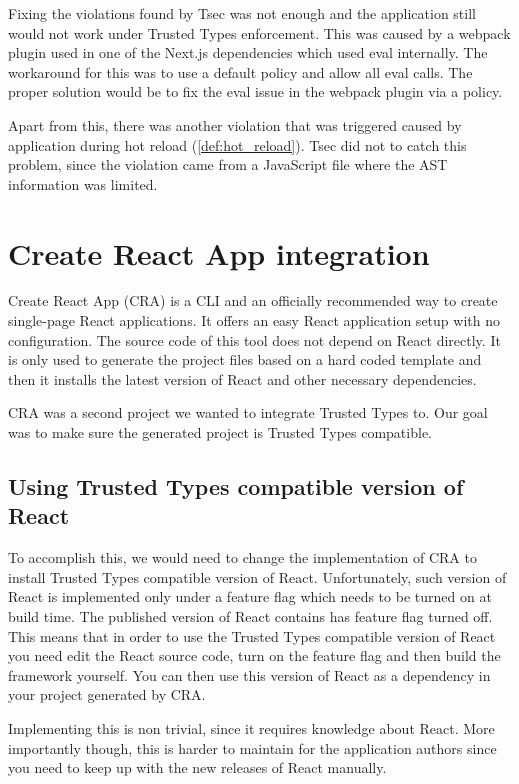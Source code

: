 Fixing the violations found by Tsec was not enough and the application still would not work under
Trusted Types enforcement. This was caused by a webpack plugin used in one of the Next.js
dependencies which used eval internally. The workaround for this was to use a default policy and
allow all eval calls. The proper solution would be to fix the eval issue in the webpack plugin via a
policy.

Apart from this, there was another violation that was triggered caused by application during hot
reload (\ref{def:hot_reload}). Tsec did not to catch this problem, since the violation came from a
JavaScript file where the AST information was limited.

\section{Create React App integration}

Create React App (CRA) is a CLI and an officially recommended way to create single-page React
applications. It offers an easy React application setup with no configuration. The source code of
this tool does not depend on React directly. It is only used to generate the project files based on
a hard coded template and then it installs the latest version of React and other necessary
dependencies.

CRA was a second project we wanted to integrate Trusted Types to. Our goal was to make sure the
generated project is Trusted Types compatible.

\subsection{Using Trusted Types compatible version of React}

To accomplish this, we would need to change the implementation of CRA to install Trusted Types
compatible version of React. Unfortunately, such version of React is implemented only under a
feature flag which needs to be turned on at build time. The published version of React contains has
feature flag turned off. This means that in order to use the Trusted Types compatible version of
React you need edit the React source code, turn on the feature flag and then build the framework
yourself. You can then use this version of React as a dependency in your project generated by CRA.

Implementing this is non trivial, since it requires knowledge about React. More importantly though,
this is harder to maintain for the application authors since you need to keep up with the new
releases of React manually.

